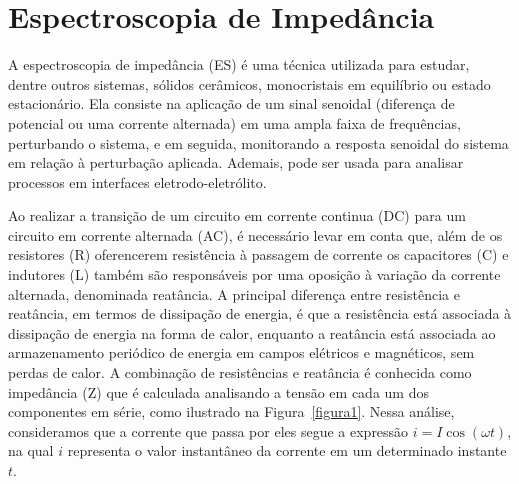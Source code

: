\section{Espectroscopia de Impedância}

A espectroscopia de impedância (ES) é uma técnica utilizada para estudar, dentre outros sistemas, sólidos cerâmicos, monocristais
 em equilíbrio ou estado estacionário. Ela consiste na aplicação de um sinal senoidal (diferença de
potencial ou uma corrente alternada) em uma ampla faixa de frequências, perturbando o
sistema, e em seguida, monitorando a resposta senoidal do sistema em relação à perturbação
aplicada. Ademais, pode ser usada para analisar processos em interfaces eletrodo-eletrólito. 

Ao realizar a transição de um circuito em corrente continua (DC) para um circuito
em corrente alternada (AC), é necessário levar em conta que, além de os resistores (R) oferencerem resistência à passagem de corrente
os capacitores (C) e indutores (L) também são responsáveis por uma oposição à variação da corrente alternada, denominada reatância. 
A principal diferença entre resistência e reatância, em termos de dissipação de energia, é que a resistência está associada à dissipação de energia na forma de calor, 
enquanto a reatância está associada ao armazenamento periódico de energia em campos elétricos e magnéticos, sem perdas de calor.
A combinação de resistências e reatância é conhecida como impedância (Z) que é
calculada analisando a tensão em cada um dos componentes em série, como ilustrado na Figura~\ref{figura1}. Nessa análise, consideramos que a corrente que passa por eles segue a expressão $i = I \cos(\omega t)$, na qual $i$ representa o valor instantâneo da corrente em um determinado instante $t$.

